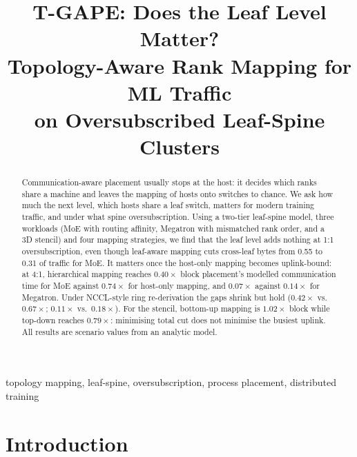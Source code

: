 \documentclass[conference]{IEEEtran}
\begin{document}
\title{T-GAPE: Does the Leaf Level Matter?\\Topology-Aware Rank Mapping for ML Traffic\\on Oversubscribed Leaf-Spine Clusters}

\author{
}

\maketitle

\begin{abstract}
Communication-aware placement usually stops at the host: it decides which ranks share a machine
and leaves the mapping of hosts onto switches to chance. We ask how much the next level, which
hosts share a leaf switch, matters for modern training traffic, and under what spine
oversubscription. Using a two-tier leaf-spine model, three workloads (MoE with routing affinity,
Megatron with mismatched rank order, and a 3D stencil) and four mapping strategies, we find
that the leaf level adds nothing at 1:1 oversubscription, even though leaf-aware mapping cuts
cross-leaf bytes from 0.55 to 0.31 of traffic for MoE. It matters once the host-only mapping
becomes uplink-bound: at 4:1, hierarchical mapping reaches $0.40\times$ block placement's modelled
communication time for MoE against $0.74\times$ for host-only mapping, and $0.07\times$ against
$0.14\times$ for Megatron. Under NCCL-style ring re-derivation the gaps shrink but hold
($0.42\times$ vs.\ $0.67\times$; $0.11\times$ vs.\ $0.18\times$). For the stencil, bottom-up
mapping is $1.02\times$ block while top-down reaches $0.79\times$: minimising total cut does not
minimise the busiest uplink. All results are scenario values from an analytic model.
\end{abstract}

\begin{IEEEkeywords}
topology mapping, leaf-spine, oversubscription, process placement, distributed training
\end{IEEEkeywords}

\section{Introduction}
\end{document}
